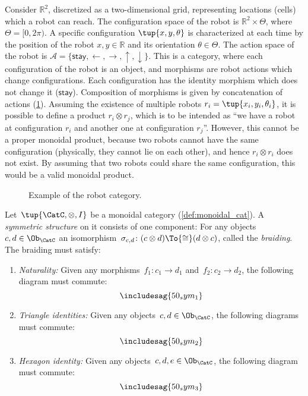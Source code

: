 \begin{example}
\label{ex:robot}
Consider $\mathbb{R}^2$, discretized as a two-dimensional grid, representing locations (cells) which a robot can reach. The configuration space of the robot is $\mathbb{R}^2\times \Theta$, where $\Theta=[0,2\pi)$. A specific configuration $\tup{x,y,\theta}$ is characterized at each time by the position of the robot $x,y\in \mathbb{R}$ and its orientation $\theta \in \Theta$. The action space of the robot is $\mathcal{A}=\{\mathsf{stay},\leftarrow, \rightarrow, \uparrow, \downarrow\}$. This is a category, where each configuration of the robot is an object, and morphisms are robot actions which change configurations. Each configuration has the identity morphism which does not change it ($\mathsf{stay}$). Composition of morphisms is given by concatenation of actions (\cref{fig:robotcategory}). Assuming the existence of multiple robots $r_i=\tup{x_i,y_i,\theta_i}$, it is possible to define a product $r_i\otimes r_j$, which is to be intended as ``we have a robot at configuration $r_i$ and another one at configuration $r_j$''. However, this cannot be a proper monoidal product, because two robots cannot have the same configuration (physically, they cannot lie on each other), and hence $r_i\otimes r_i$ does not exist. By assuming that two robots could share the same configuration, this would be a valid monoidal product.
\begin{figure}[tbh]
\begin{center}
\end{center}
\caption{Example of the robot category. \label{fig:robotcategory}}
\end{figure}
\end{example}


\begin{ctdefinition}
Let~$\tup{\CatC,\otimes,I}$ be a monoidal category (\cref{def:monoidal_cat}). A \emph{symmetric structure} on it consists of one component: For any objects~$c,d\in\Ob_\CatC$ an isomorphism~$\sigma_{c,d}\colon (c\otimes d)\To{\cong}(d\otimes c)$, called the \emph{braiding}. The braiding must satisfy:
\begin{enumerate}
	\item \emph{Naturality:} Given any morphisms~$f_1\colon c_1\to d_1$ and~$f_2\colon c_2\to d_2$, the following diagram must commute:
	\begin{equation}
	\includesag{50_sym_1}
	\end{equation}
	\item \emph{Triangle identities:} Given any objects~$c,d\in\Ob_\CatC$, the following diagrams must commute:
\begin{equation}
	\includesag{50_sym_2}
\end{equation}
\item \emph{Hexagon identity:} Given any objects~$c,d,e\in \Ob_\CatC$, the following diagram must commute:
\begin{equation}
    \includesag{50_sym_3}
\end{equation}
\end{enumerate}
\end{ctdefinition} 
